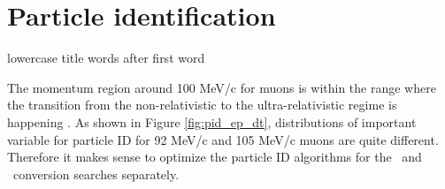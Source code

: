 

\section{Particle identification}
{\blue lowercase title words after first word}

{\blue The m}omentum region around 100 MeV/c {\blue for} muons is within the range where
{\blue the} transition from {\blue the} non-relativistic
to {\blue the} ultra-relativistic regime is happening . As shown in Figure \ref{fig:pid_ep_dt}{\blue ,}
distributions of important  {\blue variable for particle ID} for 92 MeV/c and 105 MeV/c muons are quite
different. Therefore it makes sense to optimize the particle ID algorithms for {\blue the} \MuToEm\ and \MuToEp\ 
conversion searches separately.

